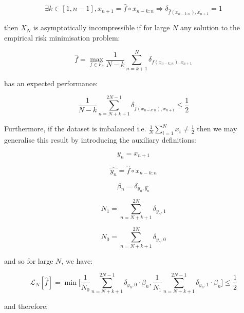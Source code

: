 \documentclass{article}
\begin{document}
\begin{equation}
\exists k \in [1,n-1], x_{n+1} = \hat{f} \circ x_{n-k:n} \Rightarrow \delta_{\hat{f}(x_{n-k:n}),x_{n+1}} = 1	
\end{equation}

then $X_N$ is asymptotically incompressible if for large $N$ any solution to the 
empirical risk minimisation problem: 

\begin{equation}
\hat{f} = \max_{f \in F_{\theta}} \frac{1}{N-k} \sum_{n=k+1}^N \delta_{f(x_{n-k:n}),x_{n+1}}
\end{equation}

has an expected performance: 

\begin{equation}
\frac{1}{N-k} \sum_{n=N+k+1}^{2N-1} \delta_{\hat{f}(x_{n-k:n}),x_{n+1}}
 \leq \frac{1}{2}
\end{equation}

Furthermore, if the dataset is imbalanced i.e. $\frac{1}{N} \sum_{i=1}^N x_i \neq \frac{1}{2}$ then we may generalise this result by introducing the auxiliary definitions: 

\begin{equation}
y_n = x_{n+1}	
\end{equation}

\begin{equation}
\hat{y_n} = \hat{f} \circ x_{n-k:n}
\end{equation}

\begin{equation}
\beta_n = \delta_{y_n,\hat{y_n}}	
\end{equation}

\begin{equation}
N_1 = \sum_{n=N+k+1}^{2N} \delta_{y_n,1}	
\end{equation}

\begin{equation}
N_0 = \sum_{n=N+k+1}^{2N} \delta_{y_n,0}	
\end{equation}

and so for large $N$, we have: 

\begin{equation}
\mathcal{L}_N[\hat{f}] = \min \Big[\frac{1}{N_0} \sum_{n=N+k+1}^{2N-1} \delta_{y_n,0} \cdot \beta_n,  \frac{1}{N_1} \sum_{n=N+k+1}^{2N-1} \delta_{y_n,1} \cdot \beta_n \Big] \leq \frac{1}{2}
\end{equation}

and therefore:
\end{document}
